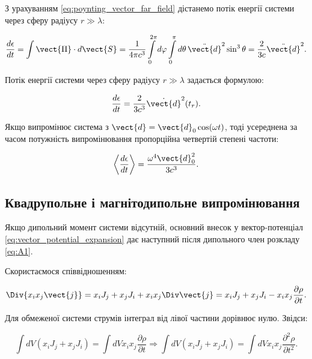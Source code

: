 З урахуванням \eqref{eq:poynting_vector_far_field} дістанемо потік енергії системи через сферу радіусу \( r \gg \lambda \):

\begin{equation*}
	\frac{d\epsilon}{dt} = \int \vect{\Pi} \cdot d\vect{S} = \frac{1}{4\pi c^3} \int\limits_0^{2\pi} d\varphi \int\limits_0^\pi d\theta \, \ddot{\vect{d}}^2
	\sin^3
	\theta
	=
	\frac{2}{3c} \ddot{\vect{d}}^2.
\end{equation*}

Потік енергії системи через сферу радіусу \( r \gg \lambda \) задається формулою:

\begin{equation}
	\frac{d\epsilon}{dt} = \frac{2}{3c^3} \dot{\vect{d}}^2(t_r).
	\label{eq:energy_flux}
\end{equation}

Якщо випромінює система з \( \vect{d} = \vect{d}_0 \cos(\omega t) \), тоді усереднена за часом потужність випромінювання пропорційна четвертій степені
частоти:

\begin{equation*}
	\left\langle \frac{d\epsilon}{dt} \right\rangle = \frac{\omega^4 \vect{d}_0^2}{3c^3}.
\end{equation*}

\subsection*{Квадрупольне і магнітодипольне випромінювання}

Якщо дипольний момент системи відсутній, основний внесок у вектор-потенціал \eqref{eq:vector_potential_expansion} дає наступний після дипольного член
розкладу \eqref{eq:A1}.

Скористаємося співвідношенням:

\begin{equation*}
	\Div\{x_i x_j \vect{j}\} = x_i J_j + x_j J_i + x_i x_j \Div \vect{j} = x_i J_j + x_j J_i - x_i x_j \frac{\partial \rho}{\partial t}.
\end{equation*}

Для обмеженої системи струмів інтеграл від лівої частини дорівнює нулю. Звідси:

\begin{equation*}
	\int dV (x_i J_j + x_j J_i) = \int dV x_i x_j \frac{\partial \rho}{\partial t} \Rightarrow \int dV (x_i J_j + x_j J_i) = \int dV x_i x_j
	\frac{\partial^2 \rho}{\partial t^2}.
\end{equation*}

